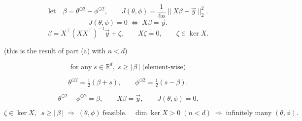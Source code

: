 
\begin{answer}
$$
\text{let}\quad 
\beta=\theta^{\odot 2}-\phi^{\odot 2},
\qquad 
J(\theta,\phi)=\frac{1}{4n}\|X\beta-\vec y\|_{2}^{2}.
$$
$$
J(\theta,\phi)=0
\;\Longleftrightarrow\;
X\beta=\vec y .
$$
$$
\beta
=
X^{\top}(XX^{\top})^{-1}\vec y+\zeta,
\qquad
X\zeta=0 ,
\qquad
\zeta\in\ker X .
$$

(this is the result of part (a) with $n<d$)


$$
\text{for any}\;
s\in\mathbb R^{d},\;s\ge |\,\beta\,|\;\text{(element-wise)}
$$

$$
\theta^{\odot 2}=\tfrac12(\beta+s),
\qquad
\phi^{\odot 2}=\tfrac12(s-\beta).
$$

$$
\theta^{\odot 2}-\phi^{\odot 2}=\beta,
\qquad
X\beta=\vec y,
\qquad
J(\theta,\phi)=0.
$$


$$
\zeta\in\ker X,\;\;s\ge|\,\beta\,|
\;\Longrightarrow\;
(\theta,\phi)\;\text{feasible}.
\quad
\dim\ker X>0\;(n<d)
\;\Longrightarrow\;
\text{infinitely many }(\theta,\phi).
$$
\end{answer}